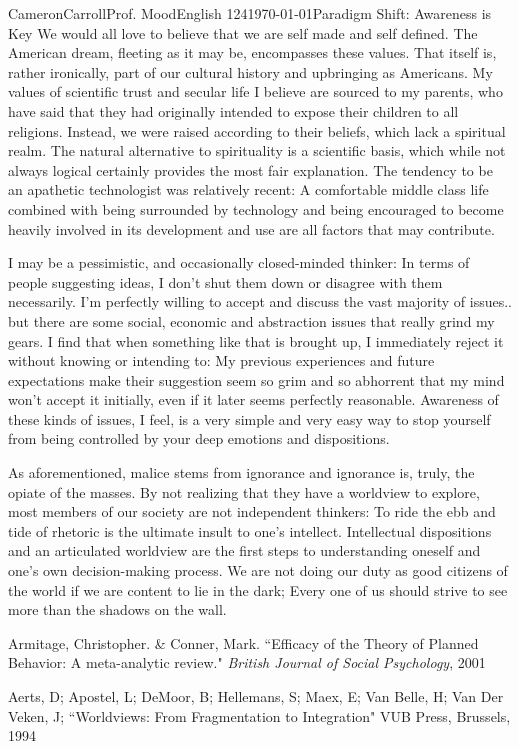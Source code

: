 \documentclass[12pt,letterpaper]{article}
\begin{document}
\begin{mla}{Cameron}{Carroll}{Prof. Mood}{English 124}{\today}{Paradigm Shift: Awareness is Key}
We would all love to believe that we are self made and self defined. The American dream, fleeting as it may be, encompasses these values. That itself is, rather ironically, part of our cultural history and upbringing as Americans. My values of scientific trust and secular life I believe are sourced to my parents, who have said that they had originally intended to expose their children to all religions. Instead, we were raised according to their beliefs, which lack a spiritual realm. The natural alternative to spirituality is a scientific basis, which while not always logical certainly provides the most fair explanation. The tendency to be an apathetic technologist was relatively recent: A comfortable middle class life combined with being surrounded by technology and being encouraged to become heavily involved in its development and use are all factors that may contribute.

I may be a pessimistic, and occasionally closed-minded thinker: In terms of people suggesting ideas, I don't shut them down or disagree with them necessarily. I'm perfectly willing to accept and discuss the vast majority of issues.. but there are some social, economic and abstraction issues that really grind my gears. I find that when something like that is brought up, I immediately reject it without knowing or intending to: My previous experiences and future expectations make their suggestion seem so grim and so abhorrent that my mind won't accept it initially, even if it later seems perfectly reasonable. Awareness of these kinds of issues, I feel, is a very simple and very easy way to stop yourself from being controlled by your deep emotions and dispositions. 

 As aforementioned, malice stems from ignorance and ignorance is, truly, the opiate of the masses. By not realizing that they have a worldview to explore, most members of our society are not independent thinkers: To ride the ebb and tide of rhetoric is the ultimate insult to one's intellect. Intellectual dispositions and an articulated worldview are the first steps to understanding oneself and one's own decision-making process. We are not doing our duty as good citizens of the world if we are content to lie in the dark; Every one of us should strive to see more than the shadows on the wall.

\begin{workscited}

\bibent
Armitage, Christopher. \& Conner, Mark. ``Efficacy of the Theory of Planned Behavior: A meta-analytic review." \textit{British Journal of Social Psychology}, 2001

\bibent
Aerts, D; Apostel, L; DeMoor, B; Hellemans, S; Maex, E; Van Belle, H; Van Der Veken, J; ``Worldviews: From Fragmentation to Integration" VUB Press, Brussels, 1994 

\end{workscited}


\end{mla}
\end{document}
